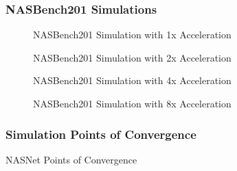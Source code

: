 \documentclass[twocolumn]{article}
\begin{document}
\FloatBarrier
\clearpage
\subsubsection{NASBench201 Simulations}

\begin{figure}[!h]
    \begin{center}
        
    \end{center}
    \caption{NASBench201 Simulation with 1x Acceleration}
    \label{fig:nasbench_1x_acceleration}
\end{figure}

\begin{figure}
    \begin{center}
        
    \end{center}
    \caption{NASBench201 Simulation with 2x Acceleration}
    \label{fig:nasbench_2x_acceleration}
\end{figure}

\begin{figure}
    \begin{center}
        
    \end{center}
    \caption{NASBench201 Simulation with 4x Acceleration}
    \label{fig:nasbench_4x_acceleration}
\end{figure}

\begin{figure}
    \begin{center}
        
    \end{center}
    \caption{NASBench201 Simulation with 8x Acceleration}
    \label{fig:nasbench_8x_acceleration}
\end{figure}

\FloatBarrier
\clearpage
\subsubsection{Simulation Points of Convergence}

\begin{table}[!h]
    \begin{center}
        \caption{NASNet Points of Convergence}
        \label{table:nasnet_convergence}
    \end{center}
\end{table}
\end{document}
